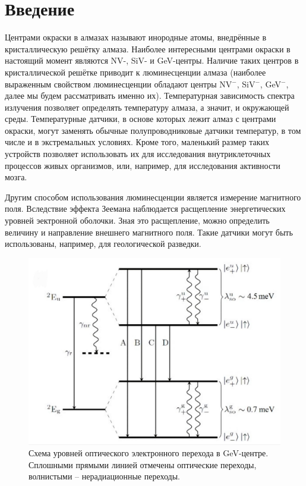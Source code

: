 \section{Введение}
Центрами окраски в алмазах называют инородные атомы, внедрённые 
в кристаллическую решётку алмаза. Наиболее интересными центрами окраски
в настоящий момент являются NV-, SiV- и GeV-центры. Наличие таких центров
в кристаллической решётке приводит к люминесценции алмаза (наиболее 
выраженным свойством люминесценции обладают центры NV$^-$, SiV$^-$,
GeV$^-$, далее мы будем рассматривать именно их). Температурная
зависимость спектра излучения позволяет определять температуру алмаза,
а значит, и окружающей среды. Температурные датчики, в основе которых лежит
алмаз с центрами окраски, могут заменять обычные полупроводниковые датчики
температур, в том числе и в экстремальных условиях. Кроме того, маленький размер
таких устройств позволяет использовать их для исследования внутриклеточных 
процессов живых организмов, или, например, для исследования активности мозга.

Другим способом использования люминесценции является измерение магнитного поля.
Вследствие эффекта Зеемана наблюдается расщепление энергетических уровней 
эектронной оболочки. Зная это расщепление, можно определить величину и направление
внешнего магнитного поля. Такие датчики могут быть использованы, например, для
геологической разведки. 

\begin{figure}[!h]
    \begin{center}
        \includegraphics[width=0.7 \linewidth]{Energy levels.jpg}
        \caption{Схема уровней оптического электронного перехода в GeV-центре.
        Сплошными прямыми линией отмечены оптические переходы,
        волнистыми -- нерадиационные переходы.}
        \label{Energy levels}
    \end{center}
\end{figure}


